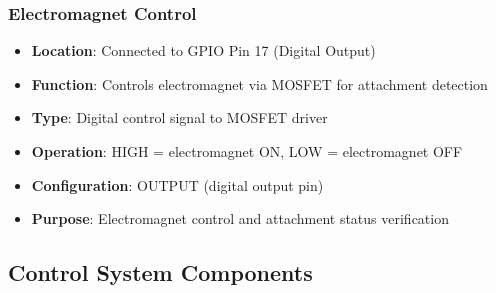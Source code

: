 \documentclass[11pt,a4paper]{article}
\begin{document}
\subsubsection{Electromagnet Control}
\begin{itemize}
    \item \textbf{Location}: Connected to GPIO Pin 17 (Digital Output)
    \item \textbf{Function}: Controls electromagnet via MOSFET for attachment detection
    \item \textbf{Type}: Digital control signal to MOSFET driver
    \item \textbf{Operation}: HIGH = electromagnet ON, LOW = electromagnet OFF
    \item \textbf{Configuration}: OUTPUT (digital output pin)
    \item \textbf{Purpose}: Electromagnet control and attachment status verification
\end{itemize}

\subsection{Control System Components}
\end{document}
